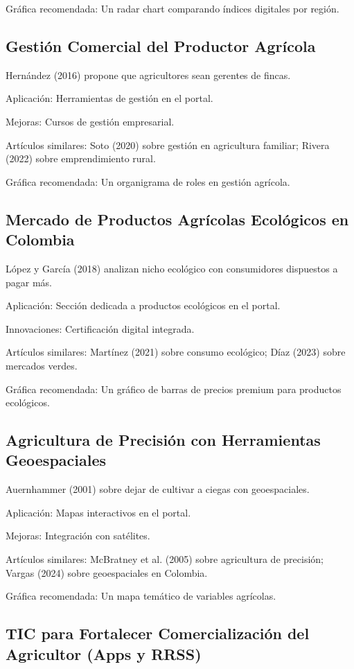 Gráfica recomendada: Un radar chart comparando índices digitales por región.

\subsection{Gestión Comercial del Productor Agrícola}

Hernández (2016) propone que agricultores sean gerentes de fincas.

Aplicación: Herramientas de gestión en el portal.

Mejoras: Cursos de gestión empresarial.

Artículos similares: Soto (2020) sobre gestión en agricultura familiar; Rivera (2022) sobre emprendimiento rural.

Gráfica recomendada: Un organigrama de roles en gestión agrícola.

\subsection{Mercado de Productos Agrícolas Ecológicos en Colombia}

López y García (2018) analizan nicho ecológico con consumidores dispuestos a pagar más.

Aplicación: Sección dedicada a productos ecológicos en el portal.

Innovaciones: Certificación digital integrada.

Artículos similares: Martínez (2021) sobre consumo ecológico; Díaz (2023) sobre mercados verdes.

Gráfica recomendada: Un gráfico de barras de precios premium para productos ecológicos.

\subsection{Agricultura de Precisión con Herramientas Geoespaciales}

Auernhammer (2001) sobre dejar de cultivar a ciegas con geoespaciales.

Aplicación: Mapas interactivos en el portal.

Mejoras: Integración con satélites.

Artículos similares: McBratney et al. (2005) sobre agricultura de precisión; Vargas (2024) sobre geoespaciales en Colombia.

Gráfica recomendada: Un mapa temático de variables agrícolas.

\subsection{TIC para Fortalecer Comercialización del Agricultor (Apps y RRSS)}

